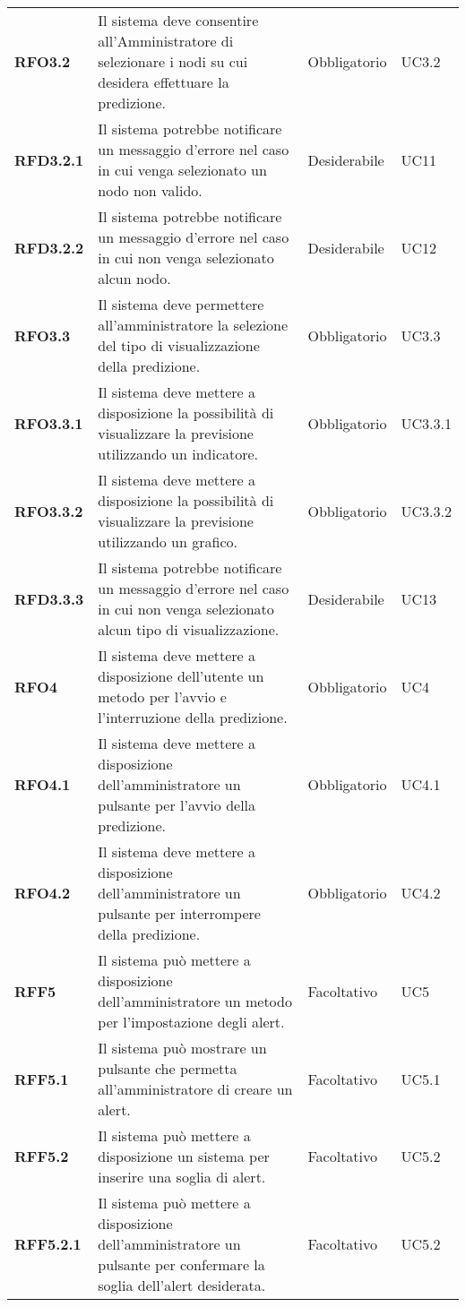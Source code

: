 \begin{longtable}[H]{>{\centering\bfseries}m{2cm} >{\centering}m{9cm} >{\centering}m{2.5cm} >{\centering\arraybackslash}m{2.5cm}}
  \textbf{RFO3.2} & Il sistema deve consentire all’Amministratore di selezionare i nodi su cui desidera effettuare la predizione. & Obbligatorio & UC3.2 \\
  \textbf{RFD3.2.1} & Il sistema potrebbe notificare un messaggio d'errore nel caso in cui venga selezionato un nodo non valido. & Desiderabile & UC11 \\
  \textbf{RFD3.2.2} & Il sistema potrebbe notificare un messaggio d'errore nel caso in cui non venga selezionato alcun nodo. & Desiderabile & UC12 \\
  \textbf{RFO3.3} & Il sistema deve permettere all’amministratore la selezione del tipo di visualizzazione della predizione. & Obbligatorio & UC3.3 \\
  \textbf{RFO3.3.1} & Il sistema deve mettere a disposizione la possibilità di visualizzare la previsione utilizzando un indicatore. & Obbligatorio & UC3.3.1 \\
  \textbf{RFO3.3.2} & Il sistema deve mettere a disposizione la possibilità di visualizzare la previsione utilizzando un grafico. & Obbligatorio & UC3.3.2 \\
  \textbf{RFD3.3.3} & Il sistema potrebbe notificare un messaggio d'errore nel caso in cui non venga selezionato alcun tipo di visualizzazione. & Desiderabile & UC13 \\
  \textbf{RFO4} & Il sistema deve mettere a disposizione dell’utente un metodo per l’avvio e l’interruzione della predizione. & Obbligatorio & UC4 \\
  \textbf{RFO4.1} & Il sistema deve mettere a disposizione dell’amministratore un pulsante per l’avvio della predizione. & Obbligatorio & UC4.1 \\
  \textbf{RFO4.2} & Il sistema deve mettere a disposizione dell’amministratore un pulsante per interrompere della predizione. & Obbligatorio & UC4.2 \\
  \textbf{RFF5} & Il sistema può mettere a disposizione dell’amministratore un metodo per l’impostazione degli alert. & Facoltativo & UC5 \\
  \textbf{RFF5.1} & Il sistema può mostrare un pulsante che permetta all'amministratore di creare un alert. & Facoltativo & UC5.1 \\
  \textbf{RFF5.2} & Il sistema può mettere a disposizione un sistema per inserire una soglia di alert. & Facoltativo & UC5.2 \\
  \textbf{RFF5.2.1} & Il sistema può mettere a disposizione dell’amministratore un pulsante per confermare la soglia dell’alert desiderata. & Facoltativo & UC5.2 \\

\end{longtable}
